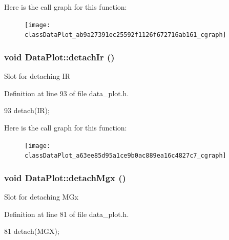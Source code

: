 Here is the call graph for this function:\nopagebreak
\begin{figure}[H]
\begin{center}
\leavevmode
\texttt{[image: classDataPlot\_ab9a27391ec25592f1126f672716ab161\_cgraph]}
\end{center}
\end{figure}


\hypertarget{classDataPlot_a63ee85d95a1ce9b0ac889ea16c4827c7}{
\subsubsection[{detachIr}]{\setlength{\rightskip}{0pt plus 5cm}void DataPlot::detachIr ()}}
\label{classDataPlot_a63ee85d95a1ce9b0ac889ea16c4827c7}
Slot for detaching IR 

Definition at line 93 of file data\_\-plot.h.




\begin{DoxyCode}
93 { detach(IR); }
\end{DoxyCode}




Here is the call graph for this function:\nopagebreak
\begin{figure}[H]
\begin{center}
\leavevmode
\texttt{[image: classDataPlot\_a63ee85d95a1ce9b0ac889ea16c4827c7\_cgraph]}
\end{center}
\end{figure}


\hypertarget{classDataPlot_a74bc8f9c94caa90e092e1b3235c2c6ec}{
\subsubsection[{detachMgx}]{\setlength{\rightskip}{0pt plus 5cm}void DataPlot::detachMgx ()}}
\label{classDataPlot_a74bc8f9c94caa90e092e1b3235c2c6ec}
Slot for detaching MGx 

Definition at line 81 of file data\_\-plot.h.




\begin{DoxyCode}
81 { detach(MGX); }
\end{DoxyCode}





